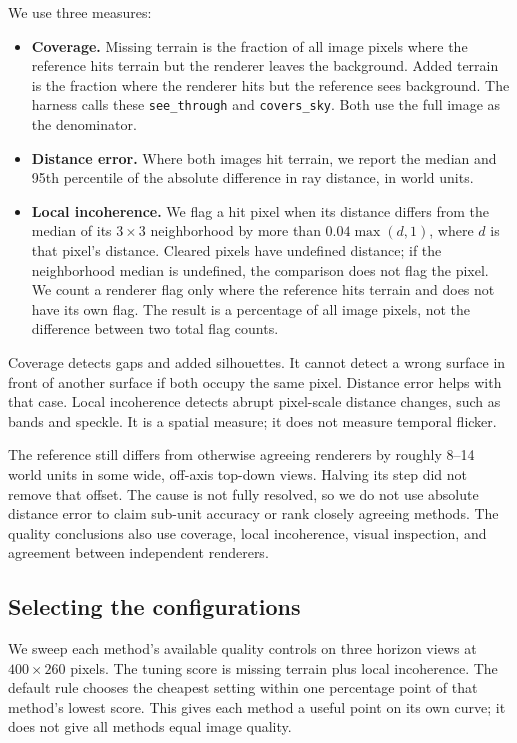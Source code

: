 \documentclass{jcgt}
\newcommand{\code}[1]{\texttt{#1}}
\begin{document}
We use three measures:
\begin{itemize}
\item \textbf{Coverage.} Missing terrain is the fraction of all image pixels where the reference hits terrain but the renderer leaves the background. Added terrain is the fraction where the renderer hits but the reference sees background. The harness calls these \code{see\_through} and \code{covers\_sky}. Both use the full image as the denominator.
\item \textbf{Distance error.} Where both images hit terrain, we report the median and 95th percentile of the absolute difference in ray distance, in world units.
\item \textbf{Local incoherence.} We flag a hit pixel when its distance differs from the median of its $3\times3$ neighborhood by more than $0.04\max(d,1)$, where $d$ is that pixel's distance. Cleared pixels have undefined distance; if the neighborhood median is undefined, the comparison does not flag the pixel. We count a renderer flag only where the reference hits terrain and does not have its own flag. The result is a percentage of all image pixels, not the difference between two total flag counts.
\end{itemize}

Coverage detects gaps and added silhouettes. It cannot detect a wrong surface in front of another surface if both occupy the same pixel. Distance error helps with that case. Local incoherence detects abrupt pixel-scale distance changes, such as bands and speckle. It is a spatial measure; it does not measure temporal flicker.

The reference still differs from otherwise agreeing renderers by roughly 8--14 world units in some wide, off-axis top-down views. Halving its step did not remove that offset. The cause is not fully resolved, so we do not use absolute distance error to claim sub-unit accuracy or rank closely agreeing methods. The quality conclusions also use coverage, local incoherence, visual inspection, and agreement between independent renderers.

\subsection{Selecting the configurations}\label{sec:tuning}

We sweep each method's available quality controls on three horizon views at $400\times260$ pixels. The tuning score is missing terrain plus local incoherence. The default rule chooses the cheapest setting within one percentage point of that method's lowest score. This gives each method a useful point on its own curve; it does not give all methods equal image quality.
\end{document}
